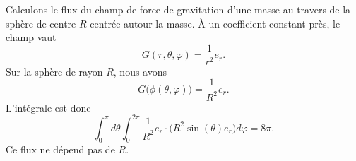 \begin{example}
	Calculons le flux du champ de force de gravitation d'une masse au travers de la sphère de centre \( R\) centrée autour la masse. À un coefficient constant près, le champ vaut
	\begin{equation}
		G(r,\theta,\varphi)=\frac{1}{ r^2 }e_r.
	\end{equation}
	Sur la sphère de rayon \( R\), nous avons
	\begin{equation}
		G\big( \phi(\theta,\varphi) \big)=\frac{1}{ R^2 }e_r.
	\end{equation}
	L'intégrale est donc
	\begin{equation}
		\int_0^{\pi}d\theta\int_0^{2\pi}\frac{1}{ R^2 }e_r\cdot \big( R^2\sin(\theta)e_r \big)d\varphi=8\pi.
	\end{equation}
	Ce flux ne dépend pas de \( R\).
\end{example}


